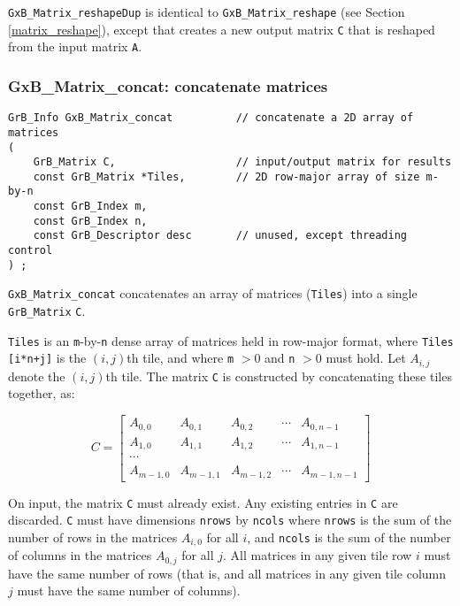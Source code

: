 \documentclass[12pt]{article}
\begin{document}
\verb'GxB_Matrix_reshapeDup' is identical to \verb'GxB_Matrix_reshape' (see
Section \ref{matrix_reshape}), except that creates a new output matrix
\verb'C' that is reshaped from the input matrix \verb'A'.

\subsubsection{{\sf GxB\_Matrix\_concat:} concatenate matrices   }
\label{matrix_concat}

\begin{mdframed}[userdefinedwidth=6in]
{\footnotesize
\begin{verbatim}
GrB_Info GxB_Matrix_concat          // concatenate a 2D array of matrices
(
    GrB_Matrix C,                   // input/output matrix for results
    const GrB_Matrix *Tiles,        // 2D row-major array of size m-by-n
    const GrB_Index m,
    const GrB_Index n,
    const GrB_Descriptor desc       // unused, except threading control
) ;
\end{verbatim} } \end{mdframed}

\verb'GxB_Matrix_concat' concatenates an array of matrices (\verb'Tiles') into
a single \verb'GrB_Matrix' \verb'C'.

\verb'Tiles' is an \verb'm'-by-\verb'n' dense array of matrices held in
row-major format, where \verb'Tiles [i*n+j]' is the $(i,j)$th tile, and where
\verb'm' $> 0$ and \verb'n' $> 0$ must hold.  Let $A_{i,j}$ denote the
$(i,j)$th tile.  The matrix \verb'C' is constructed by concatenating these
tiles together, as:

\[
C =
\left[
\begin{array}{ccccc}
          A_{0,0}   & A_{0,1}   & A_{0,2}   & \cdots & A_{0,n-1}   \\
          A_{1,0}   & A_{1,1}   & A_{1,2}   & \cdots & A_{1,n-1}   \\
          \cdots    &                                              \\
          A_{m-1,0} & A_{m-1,1} & A_{m-1,2} & \cdots & A_{m-1,n-1}
\end{array}
\right]
\]

On input, the matrix \verb'C' must already exist.  Any existing entries in
\verb'C' are discarded.  \verb'C' must have dimensions \verb'nrows' by
\verb'ncols' where \verb'nrows' is the sum of the number of rows in the
matrices $A_{i,0}$ for all $i$, and \verb'ncols' is the sum of the number of
columns in the matrices $A_{0,j}$ for all $j$.  All matrices in any given tile
row $i$ must have the same number of rows (that is, and all matrices in any
given tile column $j$ must have the same number of columns).
\end{document}
